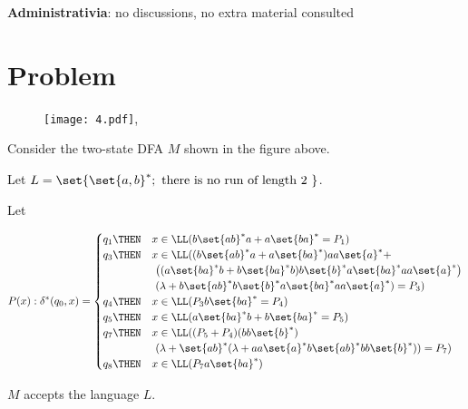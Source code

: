 \documentclass[11pt]{scrartcl}
\begin{document}
\textbf{Administrativia}: no discussions, no extra material consulted

\section{Problem}

\begin{figure}[h]
 \centering 
\texttt{[image: 4.pdf]},
\end{figure}

Consider the two-state DFA $M$ shown in the figure above.

Let $L = \set{\set{a,b}^{*}; \text{ there is no run of length 2 }}$.

Let 

\begin{equation}
P(x): \delta^{*}(q_0, x) = 
\begin{cases}
  q_1 \THEN & x \in \LL( b\set{ab}^{*}a + a \set{ba}^{*} = P_1)\\
  q_{3} \THEN & x \in \LL( (b\set{ab}^{*}a + a \set{ba}^{*})aa\set{a}^{*}+\\
  &\ \left(   (a\set{ba}^{*}b + b \set{ba}^{*}b)b \set{b}^ {*} a \set{ba}^ {*} aa \set{a}^ {*}\right) \*\\
  &\ (\lambda + b \set{ab}^{*}b \set{b}^ {*} a \set{ba}^ {*} aa \set{a}^{*}) = P_{3})\\
  q_4 \THEN & x \in \LL( P_{3}b \set{ba}^{*} = P_{4})\\
  q_5 \THEN & x \in \LL( a\set{ba}^{*}b + b \set{ba}^{*} = P_5)\\
  q_7 \THEN & x \in \LL( (P_5 + P_4)(bb \set{b}^{*})\\
&\ (\lambda + \set{ab}^{*}(\lambda + aa \set{a}^{*}b \set{ab}^{*}bb \set{b}^{*})) = P_{7})\\
  q_{8} \THEN & x \in \LL( P_7 a \set{ba}^{*})

\end{cases}
\end{equation}

\begin{lemma}
$M$ accepts the language $L$.
\end{lemma}
\end{document}
